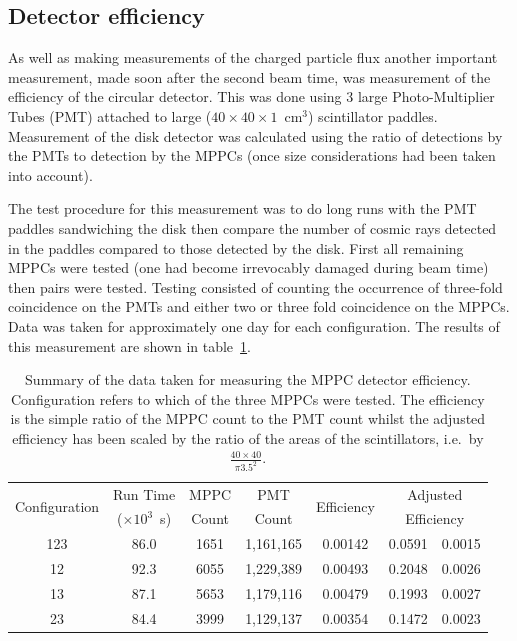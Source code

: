 \subsection{Detector efficiency} %
\label{sec:detector_efficiency}
As well as making measurements of the charged particle flux another important measurement, made soon after the second beam time, was measurement of the efficiency of the circular detector. This was done using 3 large Photo-Multiplier Tubes (PMT) attached to large (\( 40\times40\times1 \)~cm\(^3\)) scintillator paddles. Measurement of the disk detector was calculated using the ratio of detections by the PMTs to detection by the MPPCs (once size considerations had been taken into account).

The test procedure for this measurement was to do long runs with the PMT paddles sandwiching the disk then compare the number of cosmic rays detected in the paddles compared to those detected by the disk. First all remaining MPPCs were tested (one had become irrevocably damaged during beam time) then pairs were tested. Testing consisted of counting the occurrence of three-fold coincidence on the PMTs and either two or three fold coincidence on the MPPCs. Data was taken for approximately one day for each configuration. The results of this measurement are shown in table~\ref{tab:music2_eff}.

\begin{table}
  \begin{center}
    \begin{tabular}{c | c | c | c | c | r@{~\( \pm \)~}l}
      \multirow{2}{*}{Configuration} 
                     &  Run Time             &  MPPC   &  PMT        &  \multirow{2}{*}{Efficiency} 
                                                                                    &  \multicolumn{2}{c}{Adjusted}   \\
                     &  (\(\times 10^3\)~s)  &  Count  &  Count      &              &  \multicolumn{2}{c}{Efficiency} \\
      \hline
      123            &  86.0                 &  1651   &  1,161,165  &  0.00142     &  0.0591 & 0.0015  \\
      12             &  92.3                 &  6055   &  1,229,389  &  0.00493     &  0.2048 & 0.0026  \\
      13             &  87.1                 &  5653   &  1,179,116  &  0.00479     &  0.1993 & 0.0027  \\
      23             &  84.4                 &  3999   &  1,129,137  &  0.00354     &  0.1472 & 0.0023  \\
        
    \end{tabular}
  \end{center}
  \caption{Summary of the data taken for measuring the MPPC detector efficiency. Configuration refers to which of the three MPPCs were tested. The efficiency is the simple ratio of the MPPC count to the PMT count whilst the adjusted efficiency has been scaled by the ratio of the areas of the scintillators, i.e.\ by \( \frac{40\times40}{\pi3.5^2} \).}
  \label{tab:music2_eff}
\end{table}

